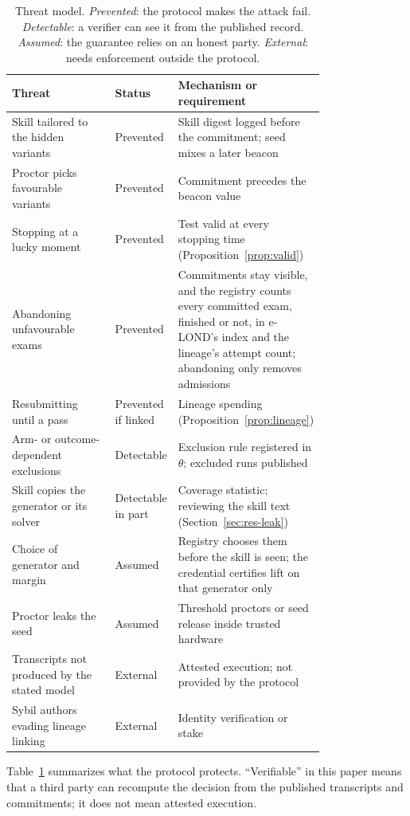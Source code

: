 \begin{table}[t]
\centering
\small
\caption{Threat model. \emph{Prevented}: the protocol makes the attack fail. \emph{Detectable}: a verifier can see it from the published record. \emph{Assumed}: the guarantee relies on an honest party. \emph{External}: needs enforcement outside the protocol.}
\label{tab:threats}
\begin{tabular}{p{0.36\linewidth}lp{0.42\linewidth}}
\toprule
Threat & Status & Mechanism or requirement \\
\midrule
Skill tailored to the hidden variants & Prevented & Skill digest logged before the commitment; seed mixes a later beacon \\
Proctor picks favourable variants & Prevented & Commitment precedes the beacon value \\
Stopping at a lucky moment & Prevented & Test valid at every stopping time (Proposition~\ref{prop:valid}) \\
Abandoning unfavourable exams & Prevented & Commitments stay visible, and the registry counts every committed exam, finished or not, in e-LOND's index and the lineage's attempt count; abandoning only removes admissions \\
Resubmitting until a pass & Prevented if linked & Lineage spending (Proposition~\ref{prop:lineage}) \\
Arm- or outcome-dependent exclusions & Detectable & Exclusion rule registered in $\theta$; excluded runs published \\
Skill copies the generator or its solver & Detectable in part & Coverage statistic; reviewing the skill text (Section~\ref{sec:res-leak}) \\
Choice of generator and margin & Assumed & Registry chooses them before the skill is seen; the credential certifies lift on that generator only \\
Proctor leaks the seed & Assumed & Threshold proctors or seed release inside trusted hardware \\
Transcripts not produced by the stated model & External & Attested execution; not provided by the protocol \\
Sybil authors evading lineage linking & External & Identity verification or stake \\
\bottomrule
\end{tabular}
\end{table}

Table~\ref{tab:threats} summarizes what the protocol protects. ``Verifiable'' in this paper means that a third party can recompute the decision from the published transcripts and commitments; it does not mean attested execution.

